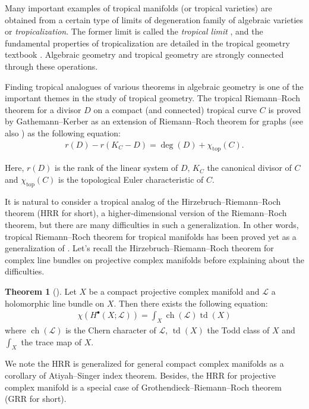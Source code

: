 \documentclass[a4paper,dvipdfmx,reqno,12pt]{amsart}
\theoremstyle{definition}
\newtheorem{theorem}{Theorem}[section]
\newcommand{\opn}[1]{\operatorname{#1}}
\numberwithin{equation}{section}
\begin{document}
Many important examples of tropical manifolds (or tropical 
varieties) 
are obtained from a certain type of limits of 
degeneration family of algebraic varieties or 
\emph{tropicalization}. 
The former limit is called the \emph{tropical limit}
\cite{itenbergTropicalHomology2019b}, and 
the fundamental properties of tropicalization 
are detailed in the tropical geometry 
textbook \cite{MR3287221}. 
Algebraic geometry and tropical geometry are 
strongly connected through these operations.

Finding tropical analogues of various theorems 
in algebraic geometry is one of the 
important themes in the study of tropical geometry.
The tropical Riemann--Roch theorem for a 
divisor $D$ on a compact (and connected) tropical curve $C$ is proved 
by Gathemann--Kerber \cite{gathmannRiemannRochTheoremTropical2008a}
as an extension of Riemann--Roch theorem for graphs
\cite{MR2355607} (see also 
\cite{mikhalkinTropicalCurvesTheir2008a}) as 
the following equation: 
\begin{align}
r(D)-r(K_C-D)=\opn{deg}(D)+\chi_{\opn{top}}(C).
\end{align}

Here, $r(D)$ is the rank of the linear system of 
$D$, $K_C$ the canonical divisor of $C$
and $\chi_{\opn{top}}(C)$ is the topological 
Euler characteristic of $C$.

It is natural to consider a tropical analog of 
the Hirzebruch--Riemann--Roch theorem
(HRR for short), 
a higher-dimensional version of the Riemann--Roch theorem, 
but there are many difficulties in such a generalization.
In other words, tropical Riemann--Roch theorem 
for tropical manifolds has been proved yet 
as a generalization of 
\cite{gathmannRiemannRochTheoremTropical2008a}.
Let's recall the Hirzebruch--Riemann--Roch 
theorem for complex line bundles on 
projective complex manifolds 
before explaining about the difficulties.
\begin{theorem}[{\cite{MR0202713}}]
Let $X$ be a compact projective complex manifold and
$\mathcal{L}$ a holomorphic line bundle on $X$.
Then there exists the following equation:
\begin{align} \label{equation-HRR}
\chi(H^{\bullet}(X;\mathcal{L}))
=\int_X \opn{ch}(\mathcal{L})\opn{td}(X)
\end{align}
where $\opn{ch}(\mathcal{L})$ is the Chern character 
of $\mathcal{L}$, 
$\opn{td}(X)$ the Todd class of $X$
and $\int_X$ the trace map of $X$. 
\end{theorem}
We note the HRR is generalized for 
general compact complex 
manifolds as a corollary of Atiyah--Singer index 
theorem. Besides, the HRR for projective complex 
manifold is a special case 
of Grothendieck--Riemann--Roch theorem (GRR for short). 
\end{document}
